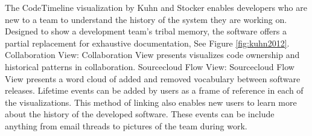 \documentclass{egpubl}
\begin{document}
The CodeTimeline visualization by Kuhn and Stocker \cite{kuhn2012} enables developers who are new to a team to understand the history of the system they are working on.  Designed to show a development team's tribal memory, the software offers a partial replacement for exhaustive documentation, See Figure \ref{fig:kuhn2012}.
Collaboration View: Collaboration View presents visualizes code ownership and historical patterns in collaboration. 
Sourcecloud Flow View: Sourcecloud Flow View presents a word cloud of added and removed vocabulary between software releases. 
Lifetime events can be added by users as a frame of reference in each of the visualizations. This method of linking also enables new users to learn more about the history of the developed software. These events can be include anything from email threads to pictures of the team during work.
\end{document}
